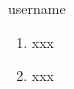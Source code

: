 \begin{prework}{ username }
  \begin{enumerate}
  \item xxx
  \item xxx
  \end{enumerate}
\end{prework}
